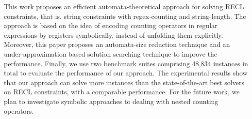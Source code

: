 %

This work proposes an efficient automata-theoretical approach for solving RECL constraints, that is, string constraints with regex-counting and string-length. The approach is based on the idea of encoding counting operators in regular expressions by registers symbolically, instead of unfolding them explicitly. Moreover, this paper proposes an automata-size reduction technique and an under-approximation based solution searching technique to improve the performance. Finally, we use two benchmark suites comprising 48,834 instances in total to evaluate the performance of our approach. The experimental results show that our approach can solve more instances than the state-of-the-art best solvers on RECL constraints, with a comparable performance. For the future work, we plan to investigate symbolic approaches to dealing with nested counting operators. 




%